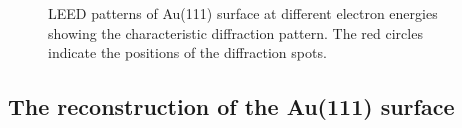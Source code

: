 \documentclass[fontsize=11pt,reqno,a4paper,oneside]{scrartcl}
\begin{document}
\begin{figure}[H]
    \hfill
    
    \caption{LEED patterns of Au(111) surface at different electron energies showing the characteristic diffraction pattern. The red circles indicate the positions of the diffraction spots.}
    \label{fig:leed_patterns_energy}
\end{figure}

\subsection{The reconstruction of the Au(111) surface}
\end{document}
